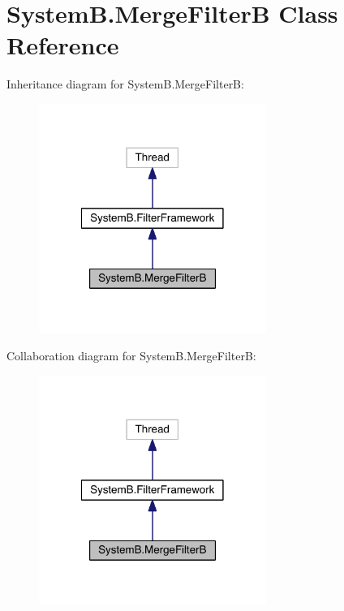 \hypertarget{class_system_b_1_1_merge_filter_b}{}\section{System\+B.\+Merge\+Filter\+B Class Reference}
\label{class_system_b_1_1_merge_filter_b}


Inheritance diagram for System\+B.\+Merge\+Filter\+B\+:
\nopagebreak
\begin{figure}[H]
\begin{center}
\leavevmode
\includegraphics[width=210pt]{class_system_b_1_1_merge_filter_b__inherit__graph}
\end{center}
\end{figure}


Collaboration diagram for System\+B.\+Merge\+Filter\+B\+:
\nopagebreak
\begin{figure}[H]
\begin{center}
\leavevmode
\includegraphics[width=210pt]{class_system_b_1_1_merge_filter_b__coll__graph}
\end{center}
\end{figure}
